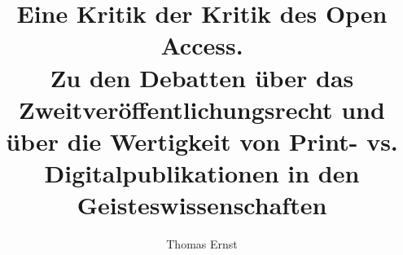 
\fancyhead[R]{\thepage} %

\title{\LARGE{Eine Kritik der Kritik des Open Access. \\ Zu den Debatten über das Zweitveröffentlichungsrecht und über die Wertigkeit von Print- vs. Digitalpublikationen in den Geisteswissenschaften}} %
\author{Thomas Ernst} %

\setcounter{page}{90}